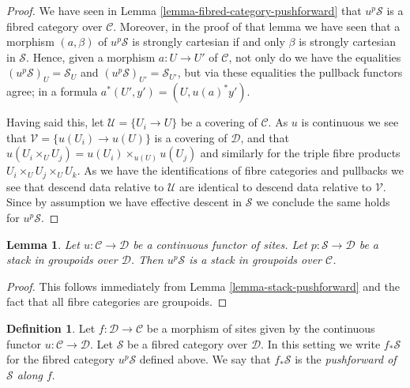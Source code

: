 \documentclass{stacks-project}
\theoremstyle{plain}
\newtheorem{lemma}[subsection]{Lemma}
\theoremstyle{definition}
\newtheorem{definition}[subsection]{Definition}
\theoremstyle{remark}
\numberwithin{equation}{subsection}
\begin{document}
\begin{proof}
We have seen in
Lemma \ref{lemma-fibred-category-pushforward}
that $u^p\mathcal{S}$ is a fibred category over $\mathcal{C}$.
Moreover, in the proof of that lemma we have seen that a morphism
$(a, \beta)$ of $u^p\mathcal{S}$ is strongly cartesian if and
only $\beta$ is strongly cartesian in $\mathcal{S}$. Hence,
given a morphism $a : U \to U'$ of $\mathcal{C}$, not only
do we have the equalities
$(u^p\mathcal{S})_U = \mathcal{S}_U$ and
$(u^p\mathcal{S})_{U'} = \mathcal{S}_{U'}$, but via these
equalities the pullback functors agree; in a formula
$a^*(U', y') = (U, u(a)^*y')$.

\medskip\noindent
Having said this, let $\mathcal{U} = \{U_i \to U\}$ be a covering
of $\mathcal{C}$. As $u$ is continuous we see that
$\mathcal{V} = \{u(U_i) \to u(U)\}$ is a covering of $\mathcal{D}$,
and that $u(U_i \times_U U_j) = u(U_i) \times_{u(U)} u(U_j)$ and
similarly for the triple fibre products $U_i \times_U U_j \times_U U_k$.
As we have the identifications of fibre categories and pullbacks
we see that descend data relative to $\mathcal{U}$ are identical
to descend data relative to $\mathcal{V}$. Since by assumption we have
effective descent in $\mathcal{S}$ we conclude the same holds for
$u^p\mathcal{S}$.
\end{proof}

\begin{lemma}
\label{lemma-stack-in-groupoids-pushforward}
Let $u : \mathcal{C} \to \mathcal{D}$ be a continuous functor of sites.
Let $p : \mathcal{S} \to \mathcal{D}$ be a stack in groupoids
over $\mathcal{D}$. Then $u^p\mathcal{S}$ is a stack in groupoids
over $\mathcal{C}$.
\end{lemma}

\begin{proof}
This follows immediately from
Lemma \ref{lemma-stack-pushforward}
and the fact that all fibre categories are groupoids.
\end{proof}

\begin{definition}
\label{definition-pushforward-stack}
Let $f : \mathcal{D} \to \mathcal{C}$ be a morphism of sites
given by the continuous functor $u : \mathcal{C} \to \mathcal{D}$.
Let $\mathcal{S}$ be a fibred category over $\mathcal{D}$.
In this setting we write {\it $f_*\mathcal{S}$} for the fibred
category $u^p\mathcal{S}$ defined above. We say that
$f_*\mathcal{S}$ is the {\it pushforward of $\mathcal{S}$ along $f$}.
\end{definition}
\end{document}
